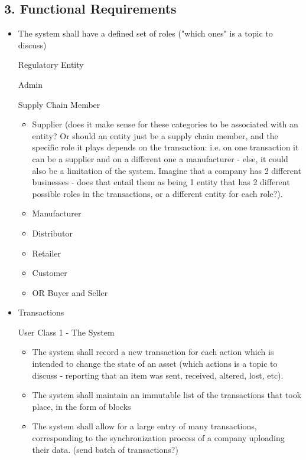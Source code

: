 \subsection*{3. Functional  Requirements}
\begin{itemize}
	\item The system shall have a defined set of roles ("which ones" is a topic to discuss) 

		\par Regulatory Entity
		\par Admin
        \par Supply Chain Member
        \begin{itemize}
			\item Supplier  (does it make sense for these categories to be associated with an entity? Or should an entity just be a supply chain member, and the specific role it plays depends on the transaction: i.e. on one transaction it can be a supplier and on a different one a manufacturer - else, it could also be a limitation of the system. Imagine that a company has 2 different businesses - does that entail them as being 1 entity that has 2 different possible roles in the transactions, or a different entity for each role?).
			\item  Manufacturer
			\item Distributor
			\item Retailer
			\item Customer
			\item OR  Buyer and Seller
		\end{itemize}
    \item Transactions
        \par User Class 1 - The System 
        \begin{itemize}
			\item The system shall record a new transaction for each action which is intended to change the state of an asset (which actions is a topic to discuss - reporting that an item was sent, received, altered, lost, etc).
			\item The system shall maintain an immutable list of the transactions that took place, in the form of blocks
			\item The system shall allow for a large entry of many transactions, corresponding to the synchronization process of a company uploading their data. (send batch of transactions?)

\end{itemize}
\end{itemize}
